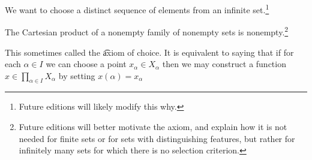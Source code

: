 

We want to choose a distinct sequence of elements from an infinite set.\footnote{Future editions will likely modify this why.}


\begin{principle}[Choice]
  The Cartesian product of a nonempty family of nonempty sets is nonempty.\footnote{Future editions will better motivate the axiom, and explain how it is not needed for finite sets or for sets with distinguishing features, but rather for infinitely many sets for which there is no selection criterion.}
\end{principle}

This sometimes called the \t{axiom of choice}.
It is equivalent to saying that if for each $\alpha \in I$ we can choose a point $x_{\alpha} \in X_{\alpha}$ then we may construct a function $x \in \prod_{\alpha \in I}X_{\alpha}$ by setting $x(\alpha) = x_{\alpha}$


\blankpage
